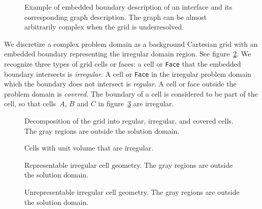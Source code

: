 \begin{figure}
\epsfxsize=4.0in
\hspace{1.0in} 
\caption{Example of embedded boundary description of an interface
and its corresponding graph description.  The graph
can be almost arbitrarily complex when the grid is
underresolved.}
\label{fig::multidivide}
\end{figure}

We discretize  a complex
problem domain as a background Cartesian grid with an embedded
boundary representing the irregular domain region.  See
figure~\ref{fig::eb-cell-types}.  We recognize three types of grid
cells or faces: a cell or {\tt Face} that the embedded boundary intersects
is {\em irregular}.  A cell or {\tt Face} in the irregular problem domain
which the boundary does not intersect is {\em regular}.  A cell or
face outside the problem domain is {\em covered}.  The boundary of a
cell is considered to be part of the cell, so that cells~$A$, $B$ and
$C$ in figure~\ref{fig::also-irreg} are irregular.  

\begin{figure}
\epsfxsize=4.0in
\hspace{1.0in} 
\caption{Decomposition of the grid into regular, 
irregular, and covered cells.  The gray regions are
outside the solution domain.}
\label{fig::eb-cell-types}
\end{figure}

\begin{figure}
\epsfxsize=2.0in
\hspace{2.0in} 
\caption{Cells with unit volume that are irregular.}
\label{fig::also-irreg}
\end{figure}

\begin{figure}
\epsfxsize=4.0in
\hspace{1.0in} 
\caption{Representable irregular cell geometry.  The gray regions
are outside the solution domain.}
\label{fig::valid-geom}
\end{figure}

\begin{figure}
\epsfxsize=1.5in
\hspace{2.5in} 
\caption{Unrepresentable irregular cell geometry.  The gray
regions are outside the solution domain.}
\label{fig::invalid-geom}
\end{figure}

